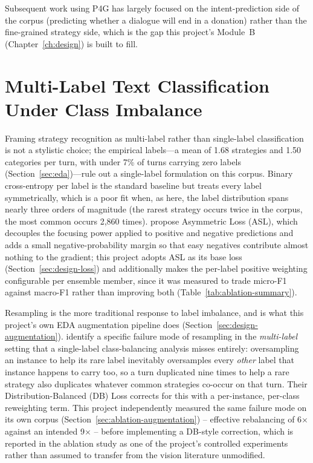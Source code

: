 Subsequent work using P4G has largely focused on the intent-prediction side
of the corpus (predicting whether a dialogue will end in a donation) rather
than the fine-grained strategy side, which is the gap this project's
Module~B (Chapter~\ref{ch:design}) is built to fill.

\section{Multi-Label Text Classification Under Class Imbalance}

Framing strategy recognition as multi-label rather than single-label
classification is not a stylistic choice; the empirical labels---a
mean of 1.68 strategies and 1.50 categories per turn, with under 7\% of
turns carrying zero labels (Section~\ref{sec:eda})---rule out a
single-label formulation on this corpus. Binary cross-entropy per label is
the standard baseline but treats every label symmetrically, which is a poor
fit when, as here, the label distribution spans nearly three orders of
magnitude (the rarest strategy occurs twice in the corpus, the most common
occurs 2{,}860 times). \citet{benbaruch2021asl} propose Asymmetric Loss
(ASL), which decouples the focusing power applied to positive and negative
predictions and adds a small negative-probability margin so that easy
negatives contribute almost nothing to the gradient; this project adopts ASL
as its base loss (Section~\ref{sec:design-loss}) and additionally makes the
per-label positive weighting configurable per ensemble member, since it was
measured to trade micro-F1 against macro-F1 rather than improving both
(Table~\ref{tab:ablation-summary}).

Resampling is the more traditional response to label imbalance, and is what
this project's own EDA augmentation pipeline does (Section~\ref{sec:design-augmentation}).
\citet{wu2020distribution} identify a specific failure mode of resampling in
the \emph{multi-label} setting that a single-label class-balancing analysis
misses entirely: oversampling an instance to help its rare label inevitably
oversamples every \emph{other} label that instance happens to carry too, so a
turn duplicated nine times to help a rare strategy also duplicates whatever
common strategies co-occur on that turn. Their Distribution-Balanced (DB)
Loss corrects for this with a per-instance, per-class reweighting term. This
project independently measured the same failure mode on its own corpus
(Section~\ref{sec:ablation-augmentation}) -- effective rebalancing of 6$\times$
against an intended 9$\times$ -- before implementing a DB-style correction,
which is reported in the ablation study as one of the project's controlled
experiments rather than assumed to transfer from the vision literature
unmodified.

